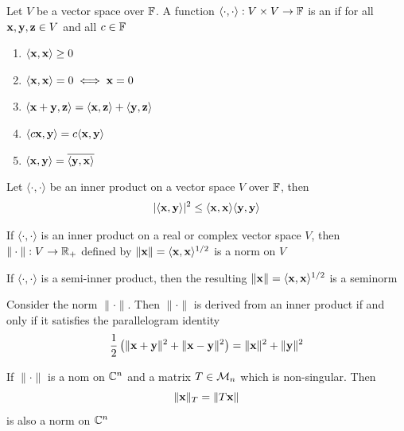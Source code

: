 \documentclass[aspectratio=169]{beamer}
\begin{document}
\begin{frame}
\begin{definition}
Let $V$ be a vector space over $\mathbb{F}$. A function $\langle\cdot,\cdot\rangle:  V \times V\to \mathbb{F}$ is an  if for all $\mathbf{x},\mathbf{y},\mathbf{z}\in V$ and all $c\in \mathbb{F}$
\begin{enumerate}
    \item $\langle\mathbf{x},\mathbf{x}\rangle \geq 0$
    \item $\langle\mathbf{x},\mathbf{x}\rangle = 0 \iff \mathbf{x}=0$
    \item $\langle\mathbf{x}+\mathbf{y},\mathbf{z}\rangle=\langle\mathbf{x},\mathbf{z}\rangle+\langle\mathbf{y},\mathbf{z}\rangle$
    \item $\langle c\mathbf{x},\mathbf{y}\rangle= c\langle\mathbf{x},\mathbf{y}\rangle$
    \item $\langle\mathbf{x},\mathbf{y}\rangle=\overline{\langle\mathbf{y},\mathbf{x}\rangle}$
\end{enumerate}
\end{definition}
\vfill
\begin{theorem}
Let $\langle\cdot,\cdot\rangle$ be an inner product on a vector space $V$ over $\mathbb{F}$, then 
\[
|\langle \mathbf{x},\mathbf{y}\rangle|^2
\leq \langle\mathbf{x},\mathbf{x}\rangle\langle\mathbf{y},\mathbf{y}\rangle
\]
\end{theorem}
\end{frame}


\begin{frame}
\begin{corollary}
If $\langle \cdot,\cdot \rangle$ is an inner product on a real or complex vector space $V$, then $\|\cdot\| : V\to \mathbb{R}_{+}$ defined by $\| \mathbf{x} \| = \langle \mathbf{x},\mathbf{x}\rangle^{1/2}$ is a norm on $V$
\end{corollary}
\vfill
\begin{remark}
If $\langle \cdot,\cdot\rangle$ is a semi-inner product, then the resulting $\| \mathbf{x} \| = \langle \mathbf{x}, \mathbf{x}\rangle^{1/2}$ is a seminorm
\end{remark}
\end{frame}



\begin{frame}
\begin{theorem}
 Consider the norm $\| \cdot \|$. Then $\| \cdot \|$ is derived from an inner product if and only if it satisfies the parallelogram identity
 \[\dfrac{1}{2}\left( \|\mathbf{x}+\mathbf{y}\|^2 +\|\mathbf{x}-\mathbf{y}\|^2\right)= \|\mathbf{x}\|^2+\|\mathbf{y}\|^2\]
\end{theorem}

\begin{theorem}
If $\|\cdot\|$ is a nom on $\mathbb{C}^n$ and a matrix $T\in \mathcal{M}_n$ which is non-singular. Then 
\[
    \|\mathbf{x}\|_T= \| T\mathbf{x} \|
\]
is also a norm on $\mathbb{C}^n$
\end{theorem}
\end{frame}
\end{document}
